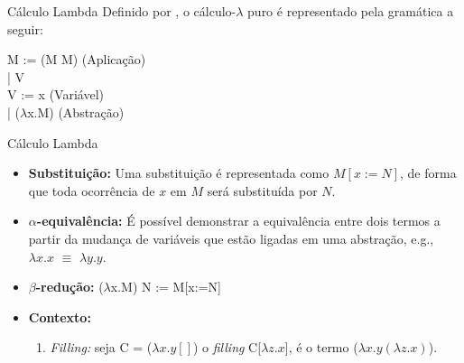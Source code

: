 \begin{frame}{Cálculo Lambda}
    Definido por , o cálculo-$\lambda$ puro é representado pela gramática a seguir:

    \begin{flushleft}
        \qquad\qquad M := (M M) \hspace{20ex} (Aplicação)\\
        \qquad\qquad\qquad | V  \\
        
        \qquad\qquad V :=  x  \hspace{26ex} (Variável)\\
        \qquad\qquad\qquad | ($\lambda$x.M) \hspace{20ex} (Abstração)\\
    \end{flushleft}
\end{frame}

\begin{frame}{Cálculo Lambda}
    \begin{itemize}
        \item \textbf{Substituição:} Uma substituição é representada como $M[x:=N]$, de forma que toda ocorrência de $x$ em $M$ será substituída por $N$.

        \item \textbf{$\alpha$-equivalência:} É possível demonstrar a equivalência entre dois termos a partir da mudança de variáveis que estão ligadas em uma abstração, e.g., $\lambda x.x$ $\equiv$ $\lambda y.y$.

        \item \textbf{$\beta$-redução:} ($\lambda$x.M) N := M[x:=N]

        \item \textbf{Contexto:} 
            \begin{enumerate}
                \item \textit{Filling:} seja C = ($\lambda x. y []$) o \textit{filling} C[$\lambda z.x$], é o termo ($\lambda x. y (\lambda z.x)$).
            \end{enumerate}
    \end{itemize}
\end{frame}